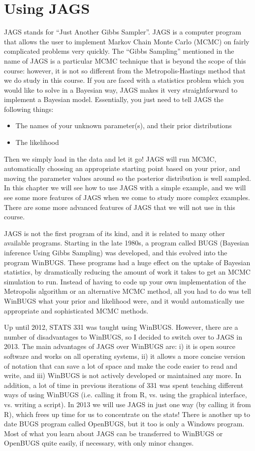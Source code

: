 \chapter{Using JAGS}
JAGS stands for ``Just Another Gibbs Sampler''. JAGS is a computer program that
allows the user
to implement Markov Chain Monte Carlo (MCMC) on fairly complicated problems
very quickly. The ``Gibbs Sampling'' mentioned in the name of JAGS
is a particular MCMC technique that is beyond the
scope of this course: however, it is not so different from the Metropolis-Hastings
method that we do study in this course. If you are faced with a statistics
problem which you would like to solve in a Bayesian way, JAGS makes it very
straightforward to implement a Bayesian model. Essentially, you just need to tell
JAGS the following things:
\begin{itemize}
\item The names of your unknown parameter(s), and their prior distributions
\item The likelihood
\end{itemize}
Then we simply load in the data and let it go! JAGS will run MCMC, automatically
choosing an appropriate starting point based on your prior,
and moving the parameter
values around so the posterior distribution is well sampled.
In this chapter we will see how to use JAGS with a simple example, and we will
see some more features of JAGS when we come to study more complex examples.
There are some more advanced features of JAGS that we will not use in this
course.

JAGS is not the first program of its kind, and it is related to many other
available programs.
Starting in the late 1980s, a program called BUGS (Bayesian inference Using
Gibbs Sampling) was developed, and this evolved into the program WinBUGS. These
programs had a huge effect on the uptake of Bayesian statistics, by dramatically
reducing the amount of work it takes to get an MCMC simulation to run. Instead
of having to code up your own implementation of the Metropolis algorithm or
an alternative MCMC method, all you had to do was tell WinBUGS what your prior
and likelihood were, and it would automatically use appropriate and sophisticated
MCMC methods.

Up until 2012, STATS 331 was taught using WinBUGS.
However, there are a number of disadvantages to
WinBUGS, so I decided to switch over to JAGS in 2013. The main advantages of
JAGS over WinBUGS are: i) it is open source software and works on all
operating systems, ii) it allows a more concise version of notation that can
save a lot of space and make the code easier to read and write, and iii) 
WinBUGS is not actively developed or maintained any more. In addition, a lot of time in previous iterations of 331 was spent teaching
different ways of using WinBUGS (i.e. calling it from R, vs. using the graphical
interface, vs. writing a script). In 2013 we will use JAGS in just one way (by calling it from R), which frees up time for us to concentrate on the stats!
There is another up to date BUGS program called OpenBUGS, but it too is only
a Windows program. Most of what you learn about JAGS can be transferred to
WinBUGS or OpenBUGS quite easily, if necessary, with only minor changes.

